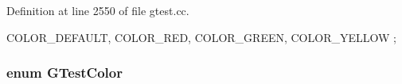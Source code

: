 \-Definition at line 2550 of file gtest.\-cc.


\begin{DoxyCode}
                {
  COLOR_DEFAULT,
  COLOR_RED,
  COLOR_GREEN,
  COLOR_YELLOW
};
\end{DoxyCode}
\hypertarget{namespacetesting_1_1internal_ae78c352c52b710a680c35b87b1c5d965}{
\subsubsection[{\-G\-Test\-Color}]{\setlength{\rightskip}{0pt plus 5cm}enum {\bf \-G\-Test\-Color}}}\label{d0/da7/namespacetesting_1_1internal_ae78c352c52b710a680c35b87b1c5d965}
